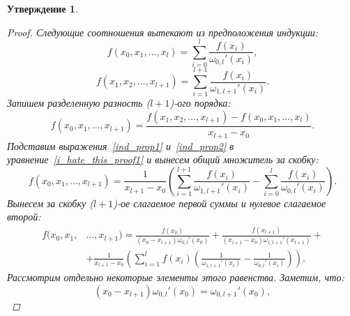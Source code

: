 \documentclass[11pt,a4paper,twoside]{report}
\numberwithin{equation}{section}
\newtheorem*{statement}{Утверждение}
\theoremstyle{definition}
\theoremstyle{plain}
\begin{document}
\begin{statement}
\begin{proof}
        Следующие соотношения вытекают из предположения индукции:
        \begin{equation}
            \label{ind_prop1}
            f(x_0, x_1, \ldots, x_l)=\sum_{i=0}^{l}{\frac{f(x_i)}
            {\omega_{0,l}'(x_i)}},
        \end{equation}
        \begin{equation}
            \label{ind_prop2}
            f(x_1, x_2, \ldots, x_{l+1})=\sum_{i=1}^{l+1}{\frac{f(x_i)}
            {\omega_{1,l+1}'(x_i)}}.
        \end{equation}
        Запишем разделенную разность ($l+1$)-ого порядка:
        \begin{equation}
            \label{i_hate_this_proof1}
            f(x_0, x_1, \ldots, x_{l+1})=\frac{f(x_1, x_2, \ldots, x_{l+1})-
            f(x_0, x_1, \ldots, x_l)}{x_{l+1} - x_0}.
        \end{equation}
        Подставим выражения~\eqref{ind_prop1} и~\eqref{ind_prop2} в уравнение~\eqref{i_hate_this_proof1} и вынесем общий множитель за скобку:
        $$
            f(x_0, x_1, \ldots, x_{l+1})=\frac{1}{x_{l+1}-x_0}\left(\sum_{i=1}^{l+1}{\frac{f(x_i)}
            {\omega_{1,l+1}'(x_i)}}-\sum_{i=0}^{l}{\frac{f(x_i)}
            {\omega_{0,l}'(x_i)}} \right).
        $$
        Вынесем за скобку ($l+1$)-ое слагаемое первой суммы и нулевое слагаемое второй:
        \begin{equation}
            \begin{split}
                \label{i_hate_this_proof3}
             f(x_0, x_1, &\ldots, x_{l+1}) = \frac{f(x_0)}{(x_0-x_{l+1})
             \omega_{0,l}'(x_0)} +
             \frac{f(x_{l+1})}{(x_{l+1}-x_{0})\omega_{1,l+1}'(x_{l+1})} +\\
             &+ \frac{1}{x_{l+1}-x_0}\left(\sum_{i=1}^{l}{f(x_i) \left(
             \frac{1}{\omega_{1,l+1}'(x_i)} -
             \frac{1}{\omega_{0,l}'(x_i)}\right)}\right).
            \end{split}
        \end{equation}
        Рассмотрим отдельно некоторые элементы этого равенства. Заметим, что:
        $$
            (x_0-x_{l+1})\omega_{0,l}'(x_0)=\omega_{0,l+1}'(x_0),
        $$

\end{proof}
\end{statement}
\end{document}
